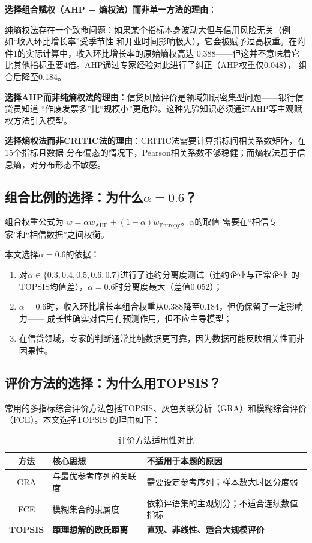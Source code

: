 \documentclass[12pt,a4paper]{ctexart}
\begin{document}
\textbf{选择组合赋权（AHP + 熵权法）而非单一方法的理由}：

纯熵权法存在一个致命问题：如果某个指标本身波动大但与信用风险无关（例如``收入环比增长率''受季节性
和开业时间影响极大），它会被赋予过高权重。在附件1的实际计算中，收入环比增长率的原始熵权高达
0.388——但这并不意味着它比其他指标重要4倍。AHP通过专家经验对此进行了纠正（AHP权重仅0.048），
组合后降至0.184。

\textbf{选择AHP而非纯熵权法的理由}：信贷风险评价是领域知识密集型问题——银行信贷员知道
``作废发票多''比``规模小''更危险。这种先验知识必须通过AHP等主观赋权方法引入模型。

\textbf{选择熵权法而非CRITIC法的理由}：CRITIC法需要计算指标间相关系数矩阵，在15个指标且数据
分布偏态的情况下，Pearson相关系数不够稳健；而熵权法基于信息熵，对分布形态不敏感。

\subsection{组合比例的选择：为什么$\alpha=0.6$？}

组合权重公式为 $w = \alpha w_{\text{AHP}} + (1-\alpha) w_{\text{Entropy}}$。$\alpha$的取值
需要在``相信专家''和``相信数据''之间权衡。

本文选择$\alpha=0.6$的依据：
\begin{enumerate}
    \item 对$\alpha \in \{0.3, 0.4, 0.5, 0.6, 0.7\}$进行了违约分离度测试（违约企业与正常企业
          的TOPSIS均值差），$\alpha=0.6$时分离度最大（差值0.052）；
    \item $\alpha=0.6$时，收入环比增长率组合权重从0.388降至0.184，但仍保留了一定影响力——
          成长性确实对信用有预测作用，但不应主导模型；
    \item 在信贷领域，专家的判断通常比纯数据更可靠，因为数据可能反映相关性而非因果性。
\end{enumerate}

\subsection{评价方法的选择：为什么用TOPSIS？}

常用的多指标综合评价方法包括TOPSIS、灰色关联分析（GRA）和模糊综合评价（FCE）。本文选择TOPSIS
的理由如下：

\begin{table}[H]
\centering
\caption{评价方法适用性对比}
\label{tab:method_comparison}
\begin{tabular}{c|l|l}
\toprule
\textbf{方法} & \textbf{核心思想} & \textbf{不适用于本题的原因} \\
\midrule
GRA & 与最优参考序列的关联度 & 需要设定参考序列；样本数大时区分度弱 \\
FCE & 模糊集合的隶属度 & 依赖评语集的主观划分；不适合连续数值指标 \\
\textbf{TOPSIS} & \textbf{距理想解的欧氏距离} & \textbf{直观、非线性、适合大规模评价} \\
\bottomrule
\end{tabular}
\end{table}
\end{document}
